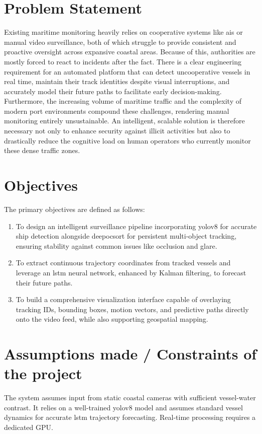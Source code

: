\section{Problem Statement}
Existing maritime monitoring heavily relies on cooperative systems like \gls{ais} or manual video surveillance, both of which struggle to provide consistent and proactive oversight across expansive coastal areas. Because of this, authorities are mostly forced to react to incidents after the fact. There is a clear engineering requirement for an automated platform that can detect uncooperative vessels in real time, maintain their track identities despite visual interruptions, and accurately model their future paths to facilitate early decision-making. Furthermore, the increasing volume of maritime traffic and the complexity of modern port environments compound these challenges, rendering manual monitoring entirely unsustainable. An intelligent, scalable solution is therefore necessary not only to enhance security against illicit activities but also to drastically reduce the cognitive load on human operators who currently monitor these dense traffic zones.

\section{Objectives}
The primary objectives are defined as follows:
\begin{enumerate}
\item To design an intelligent surveillance pipeline incorporating \gls{yolov8} for accurate ship detection alongside \gls{deepocsort} for persistent multi-object tracking, ensuring stability against common issues like occlusion and glare.
\item To extract continuous trajectory coordinates from tracked vessels and leverage an \gls{lstm} neural network, enhanced by Kalman filtering, to forecast their future paths.
\item To build a comprehensive visualization interface capable of overlaying tracking IDs, bounding boxes, motion vectors, and predictive paths directly onto the video feed, while also supporting geospatial mapping.
\end{enumerate}

\section{Assumptions made / Constraints of the project}
The system assumes input from static coastal cameras with sufficient vessel-water contrast. It relies on a well-trained \gls{yolov8} model and assumes standard vessel dynamics for accurate \gls{lstm} trajectory forecasting. Real-time processing requires a dedicated GPU.

